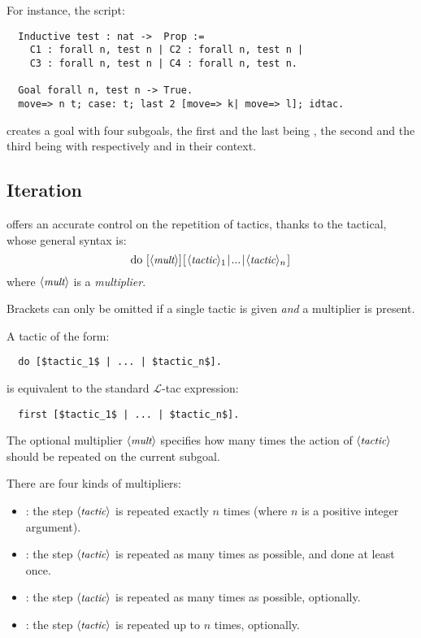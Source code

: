 For instance, the script:
\begin{lstlisting}
  Inductive test : nat ->  Prop := 
    C1 : forall n, test n | C2 : forall n, test n |
    C3 : forall n, test n | C4 : forall n, test n.

  Goal forall n, test n -> True.
  move=> n t; case: t; last 2 [move=> k| move=> l]; idtac.
\end{lstlisting}

creates a goal with four subgoals, the first and the last being 
, the second and the third being  with
respectively  and  in their context.

\subsection{Iteration}\label{ssec:iter}

\ssr{} offers an accurate control on the repetition of 
tactics, thanks to the  tactical, whose general syntax is:
  $$\C{do}\ [\N{mult}]\C{[}\N{tactic}_1 \C{|} ... \C{|} \N{tactic}_n\C{]}$$ 
where $\langle\mbox{\itshape\rmfamily\small mult}\rangle$ is a \emph{multiplier}.

Brackets can only be omitted if a single tactic is given \emph{and} a
multiplier is present.

A tactic of the form:
\begin{lstlisting}
  do [$tactic_1$ | ... | $tactic_n$].
\end{lstlisting}
is equivalent to the standard $\mathcal{L}$-tac expression:
\begin{lstlisting}
  first [$tactic_1$ | ... | $tactic_n$].
\end{lstlisting}

The optional multiplier $\langle\mbox{\itshape\rmfamily\small mult}\rangle$ specifies how many times
the action of $\langle\mbox{\itshape\rmfamily\small tactic}\rangle$ should be repeated on the current subgoal.

There are four kinds of multipliers:
  \begin{itemize}
  \item {}: the step $\langle\mbox{\itshape\rmfamily\small tactic}\rangle$ is repeated exactly $n$ times
    (where $n$ is a positive integer argument).
  \item \C{!}: the step $\langle\mbox{\itshape\rmfamily\small tactic}\rangle$ is repeated as many times as possible,
    and done at least once.
  \item {}: the step $\langle\mbox{\itshape\rmfamily\small tactic}\rangle$ is repeated as many times as possible,
    optionally.
  \item {}: the step $\langle\mbox{\itshape\rmfamily\small tactic}\rangle$ is repeated up to $n$ times,
    optionally.
  \end{itemize}

